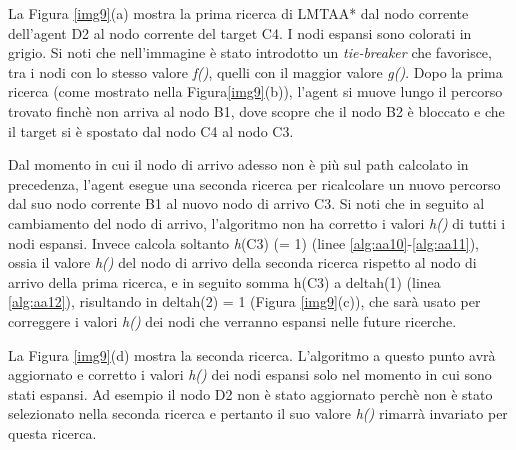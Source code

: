\documentclass[12pt]{book}
\begin{document}
\par{La Figura \ref{img9}(a) mostra la prima ricerca di LMTAA* dal nodo corrente dell'agent D2 al nodo corrente del target C4. I nodi espansi sono colorati in grigio. Si noti che nell'immagine \`e stato introdotto un \emph{tie-breaker} che favorisce, tra i nodi con lo stesso valore \emph{f()}, quelli con il maggior valore \emph{g()}. Dopo la prima ricerca (come mostrato nella Figura\ref{img9}(b)), l'agent si muove lungo il percorso trovato finch\`e non arriva al nodo B1, dove scopre che il nodo B2 \`e bloccato e che il target si \`e spostato dal nodo C4 al nodo C3.}
\par{Dal momento in cui il nodo di arrivo adesso non \`e pi\`u sul path calcolato in precedenza, l'agent esegue una seconda ricerca per ricalcolare un nuovo percorso dal suo nodo corrente B1 al nuovo nodo di arrivo C3. Si noti che in seguito al cambiamento del nodo di arrivo, l'algoritmo non ha corretto i valori \emph{h()} di tutti i nodi espansi. Invece calcola soltanto \emph{h}(C3) (= 1) (linee \ref{alg:aa10}-\ref{alg:aa11}), ossia il valore \emph{h()} del nodo di arrivo della seconda ricerca rispetto al nodo di arrivo della prima ricerca, e in seguito somma h(C3) a deltah(1) (linea \ref{alg:aa12}), risultando in deltah(2) = 1 (Figura \ref{img9}(c)), che sar\`a usato per correggere i valori \emph{h()} dei nodi che verranno espansi nelle future ricerche.}
\par{La Figura \ref{img9}(d) mostra la seconda ricerca. L'algoritmo a questo punto avr\`a aggiornato e corretto i valori \emph{h()} dei nodi espansi solo nel momento in cui sono stati espansi. Ad esempio il nodo D2 non \`e stato aggiornato perch\`e non \`e stato selezionato nella seconda ricerca e pertanto il suo valore \emph{h()} rimarr\`a invariato per questa ricerca. }
\fi

\newcommand{\populateCell}[5]{
\node at (#1 +.14, #2 +.8) {\small$#3$};
\node at (#1 +.8,#2 +.8) {$#4$};
\node at (#1 +.14,#2 +.2) {$#5$};
}
\end{document}
